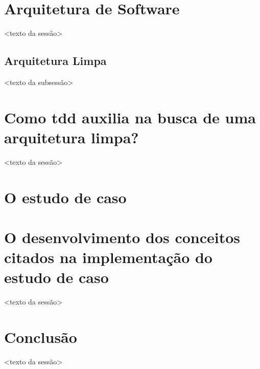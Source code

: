 \documentclass[12pt,a4paper,oneside,english,brazil]{article}
\begin{document}
      

  \section{Arquitetura de Software}

    <texto da sessão>

    \subsection{Arquitetura Limpa}

      <texto da subsessão>

  \section{Como tdd auxilia na busca de uma arquitetura limpa?}

    <texto da sessão>

  \section{O estudo de caso}

    

  \section{
    O desenvolvimento dos conceitos citados na implementação do estudo de caso
  }

    <texto da sessão>

  \section{Conclusão}

    <texto da sessão>

  \clearpage

  \renewcommand\refname{Referências Bibliográficas}

    
    
\end{document}
